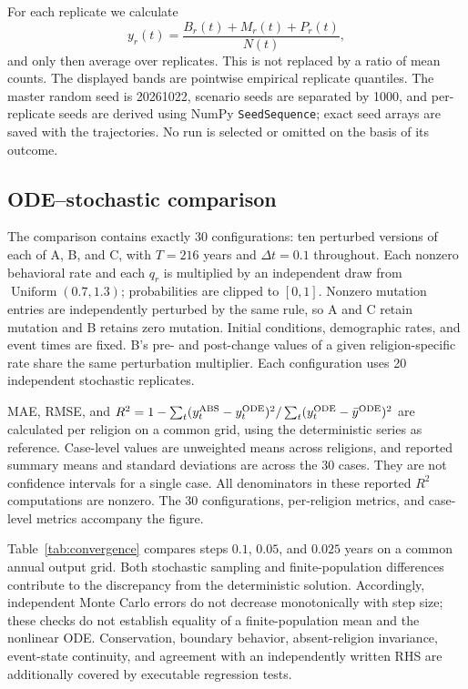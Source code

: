 \documentclass[11pt,a4paper]{article}
\begin{document}
For each replicate we calculate
\begin{equation}
y_r(t)=\frac{B_r(t)+M_r(t)+P_r(t)}{N(t)},
\label{eq:total-share}
\end{equation}
and only then average over replicates. This is not replaced by a ratio of mean counts. The displayed bands are pointwise empirical replicate quantiles. The master random seed is 20261022, scenario seeds are separated by 1000, and per-replicate seeds are derived using NumPy \texttt{SeedSequence}; exact seed arrays are saved with the trajectories. No run is selected or omitted on the basis of its outcome.

\subsection{ODE--stochastic comparison}
The comparison contains exactly 30 configurations: ten perturbed versions of each of A, B, and C, with $T=216$ years and $\Delta t=0.1$ throughout. Each nonzero behavioral rate and each $q_r$ is multiplied by an independent draw from $\operatorname{Uniform}(0.7,1.3)$; probabilities are clipped to $[0,1]$. Nonzero mutation entries are independently perturbed by the same rule, so A and C retain mutation and B retains zero mutation. Initial conditions, demographic rates, and event times are fixed. B's pre- and post-change values of a given religion-specific rate share the same perturbation multiplier. Each configuration uses 20 independent stochastic replicates.

MAE, RMSE, and $R^2=1-\sum_t(y^{\rm ABS}_t-y^{\rm ODE}_t)^2/\sum_t(y^{\rm ODE}_t-\bar y^{\rm ODE})^2$ are calculated per religion on a common grid, using the deterministic series as reference. Case-level values are unweighted means across religions, and reported summary means and standard deviations are across the 30 cases. They are not confidence intervals for a single case. All denominators in these reported $R^2$ computations are nonzero. The 30 configurations, per-religion metrics, and case-level metrics accompany the figure.

Table~\ref{tab:convergence} compares steps $0.1$, $0.05$, and $0.025$ years on a common annual output grid. Both stochastic sampling and finite-population differences contribute to the discrepancy from the deterministic solution. Accordingly, independent Monte Carlo errors do not decrease monotonically with step size; these checks do not establish equality of a finite-population mean and the nonlinear ODE. Conservation, boundary behavior, absent-religion invariance, event-state continuity, and agreement with an independently written RHS are additionally covered by executable regression tests.

\end{document}
